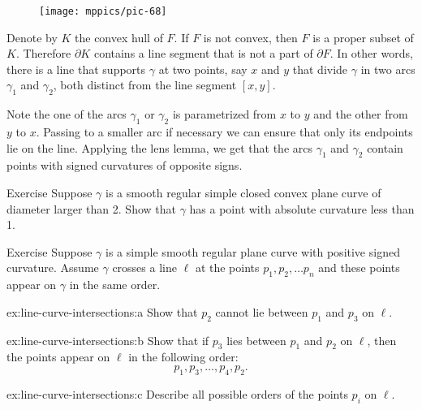 \begin{figure}
\vskip-3mm
\centering
\texttt{[image: mppics/pic-68]}
\vskip0mm
\end{figure}

Denote by $K$ the convex hull of $F$.
If $F$ is not convex, then $F$ is a proper subset of $K$.
Therefore $\partial K$ contains a line segment that is not a part of $\partial F$.
In other words, there is a line that supports $\gamma$ at two points, say $x$ and $y$ that divide $\gamma$ in two arcs $\gamma_1$ and $\gamma_2$, both distinct from the line segment $[x,y]$.

Note the one of the arcs $\gamma_1$ or $\gamma_2$ is parametrized from $x$ to $y$ and the other from $y$ to $x$.
Passing to a smaller arc if necessary we can ensure that only its endpoints lie on the line. 
Applying the lens lemma, we get that the arcs $\gamma_1$ and $\gamma_2$ contain points with signed curvatures of opposite signs.
\qeds

\begin{thm}{Exercise}\label{ex:convex small}
Suppose $\gamma$ is a smooth regular simple closed convex plane curve of diameter larger than 2.
Show that $\gamma$ has a point with absolute curvature less than 1.
\end{thm}

\begin{thm}{Exercise}\label{ex:line-curve-intersections}
Suppose $\gamma$ is a simple smooth regular plane curve with positive signed curvature.
Assume $\gamma$ crosses a line $\ell$ at the points $p_1,p_2,\dots p_n$ and these points appear on $\gamma$ in the same order.

\begin{subthm}{ex:line-curve-intersections:a} Show that $p_2$ cannot lie between $p_1$ and $p_3$ on $\ell$.
\end{subthm}

\begin{subthm}{ex:line-curve-intersections:b} Show that if $p_3$ lies between $p_1$ and $p_2$ on $\ell$, then the points appear on $\ell$ in the following order:  
\[p_1,p_3,\dots,p_4 ,p_2.\]

\end{subthm}

\begin{subthm}{ex:line-curve-intersections:c}
Describe all possible orders of the points $p_i$ on $\ell$.

\end{subthm}

\end{thm}

